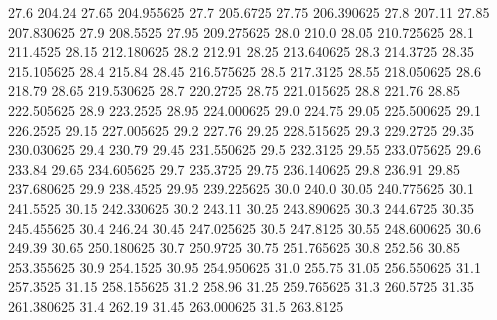            27.6           204.24
          27.65       204.955625
           27.7         205.6725
          27.75       206.390625
           27.8           207.11
          27.85       207.830625
           27.9         208.5525
          27.95       209.275625
           28.0            210.0
          28.05       210.725625
           28.1         211.4525
          28.15       212.180625
           28.2           212.91
          28.25       213.640625
           28.3         214.3725
          28.35       215.105625
           28.4           215.84
          28.45       216.575625
           28.5         217.3125
          28.55       218.050625
           28.6           218.79
          28.65       219.530625
           28.7         220.2725
          28.75       221.015625
           28.8           221.76
          28.85       222.505625
           28.9         223.2525
          28.95       224.000625
           29.0           224.75
          29.05       225.500625
           29.1         226.2525
          29.15       227.005625
           29.2           227.76
          29.25       228.515625
           29.3         229.2725
          29.35       230.030625
           29.4           230.79
          29.45       231.550625
           29.5         232.3125
          29.55       233.075625
           29.6           233.84
          29.65       234.605625
           29.7         235.3725
          29.75       236.140625
           29.8           236.91
          29.85       237.680625
           29.9         238.4525
          29.95       239.225625
           30.0            240.0
          30.05       240.775625
           30.1         241.5525
          30.15       242.330625
           30.2           243.11
          30.25       243.890625
           30.3         244.6725
          30.35       245.455625
           30.4           246.24
          30.45       247.025625
           30.5         247.8125
          30.55       248.600625
           30.6           249.39
          30.65       250.180625
           30.7         250.9725
          30.75       251.765625
           30.8           252.56
          30.85       253.355625
           30.9         254.1525
          30.95       254.950625
           31.0           255.75
          31.05       256.550625
           31.1         257.3525
          31.15       258.155625
           31.2           258.96
          31.25       259.765625
           31.3         260.5725
          31.35       261.380625
           31.4           262.19
          31.45       263.000625
           31.5         263.8125

